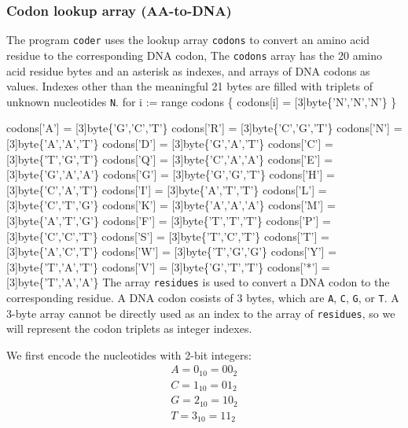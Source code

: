 \subsubsection{Codon lookup array (AA-to-DNA)}
The program \texttt{coder} uses the lookup array \texttt{codons} to
convert an amino acid residue to the corresponding DNA codon,
The \texttt{codons} array has the 20 amino acid residue bytes and an
asterisk as indexes, and arrays of DNA codons as values. Indexes other
than the meaningful 21 bytes are filled with triplets of unknown
nucleotides \texttt{N}.
\nwenddocs{}\endmoddef\nwstartdeflinemarkup{}\nwenddeflinemarkup
for i := range codons \{
          codons[i] = [3]byte\{'N','N','N'\}
\}

codons['A'] = [3]byte\{'G','C','T'\}
codons['R'] = [3]byte\{'C','G','T'\}
codons['N'] = [3]byte\{'A','A','T'\}
codons['D'] = [3]byte\{'G','A','T'\}
codons['C'] = [3]byte\{'T','G','T'\}
codons['Q'] = [3]byte\{'C','A','A'\}
codons['E'] = [3]byte\{'G','A','A'\}
codons['G'] = [3]byte\{'G','G','T'\}
codons['H'] = [3]byte\{'C','A','T'\}
codons['I'] = [3]byte\{'A','T','T'\}
codons['L'] = [3]byte\{'C','T','G'\}
codons['K'] = [3]byte\{'A','A','A'\}
codons['M'] = [3]byte\{'A','T','G'\}
codons['F'] = [3]byte\{'T','T','T'\}
codons['P'] = [3]byte\{'C','C','T'\}
codons['S'] = [3]byte\{'T','C','T'\}
codons['T'] = [3]byte\{'A','C','T'\}
codons['W'] = [3]byte\{'T','G','G'\}
codons['Y'] = [3]byte\{'T','A','T'\}
codons['V'] = [3]byte\{'G','T','T'\}
codons['*'] = [3]byte\{'T','A','A'\}
\nwendcode{}\nwdocspar
The array \texttt{residues} is used to convert a DNA codon to the
corresponding residue. A DNA codon cosists of 3 bytes, which are
\texttt{A}, \texttt{C}, \texttt{G}, or \texttt{T}. A 3-byte array
cannot be directly used as an index to the array of \texttt{residues},
so we will represent the codon triplets as integer indexes.

We first encode the nucleotides with 2-bit integers:
\begin{gather*}
A = 0_{10} = 00_2 \\
C = 1_{10} = 01_2 \\
G = 2_{10} = 10_2 \\
T = 3_{10} = 11_2
\end{gather*}

